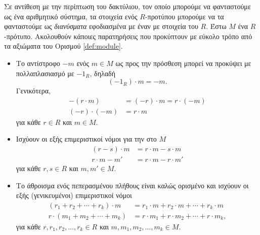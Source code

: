 \documentclass[12pt,a4paper,reqno]{amsart}
\theoremstyle{definition}
\theoremstyle{remark}
\numberwithin{theorem}{section}
\numberwithin{exercise}{section}
\numberwithin{equation}{section}
\begin{document}
Σε αντίθεση με την περίπτωση του δακτύλιου, τον οποίο μπορούμε να φανταστούμε ως ένα αριθμητικό σύστημα, τα στοιχεία ενός $R$-προτύπου μπορούμε να τα φανταστούμε ως \emph{διανύσματα} εφοδιασμένα με έναν  με στοιχεία του $R$. 
Έστω $M$ ένα $R$-πρότυπο. Ακολουθούν κάποιες παρατηρήσεις που προκύπτουν με εύκολο τρόπο από τα αξιώματα του Ορισμού \ref{def:module}.
\begin{itemize}
    \item Το αντίστροφο $-m$ ενός  $m \in M$ ως προς την πρόσθεση μπορεί να προκύψει με πολλαπλασιασμό με $-1_R$, δηλαδή 
    \[
    (-1_R)\cdot{m} = -m.
    \]
    Γενικότερα, 
    \begin{align*}
    -(r\cdot{m}) &= (-r)\cdot{m} = r\cdot(-m) \\
    (-r)\cdot(-m) &= r\cdot{m}
    \end{align*}
    για κάθε $r\in{R}$ και $m\in{M}$.
    \item Ισχύουν οι εξής επιμεριστικοί νόμοι για την  στο $M$ 
    \begin{align*}
        (r-s)\cdot{m} &= r\cdot{m} - s\cdot{m} \\ 
        r\cdot{m-m'} &= r\cdot{m} - r\cdot{m'} 
    \end{align*}
    για κάθε $r, s \in R$ και $m, m' \in M$.

    \item Το άθροισμα ενός πεπερασμένου πλήθους  είναι καλώς ορισμένο και ισχύουν οι εξής (γενικευμένοι) επιμεριστικοί νόμοι 
    \begin{align*}
        (r_1 + r_2 + \cdots + r_k)\cdot{m} &= r_1\cdot{m} + r_2\cdot{m} + \cdots + r_k\cdot{m} \\ 
        r\cdot(m_1 + m_2 + \cdots + m_k) &= r\cdot{m_1} + r\cdot{m_2} + \cdots + r\cdot{m_k}, 
    \end{align*}
    για κάθε $r, r_1, r_2, \dots, r_k \in R$ και $m, m_1, m_2, \dots, m_k \in M$.
\end{itemize}
\end{document}
